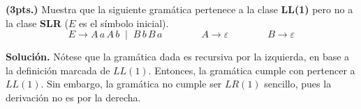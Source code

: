 \newpage
\textbf{(3pts.)} Muestra que la siguiente gram\'atica pertenece a la 
clase \textbf{LL(1)} pero no a la clase \textbf{SLR} ($E$ es el s\'imbolo inicial).
\[
E \to A \, a\, A\,b \;\mid\; B\,b\,B\,a \qquad \qquad  A \to \varepsilon 
\qquad\qquad B\to \varepsilon
\]

\textbf{Solución.} Nótese que la gramática dada es recursiva por la izquierda, en base
a la definición marcada de $LL(1)$. Entonces, la gramática cumple con pertencer a $LL(1)$.
Sin embargo, la gramática no cumple ser $LR(1)$ sencillo, pues la derivación no es por
la derecha.
